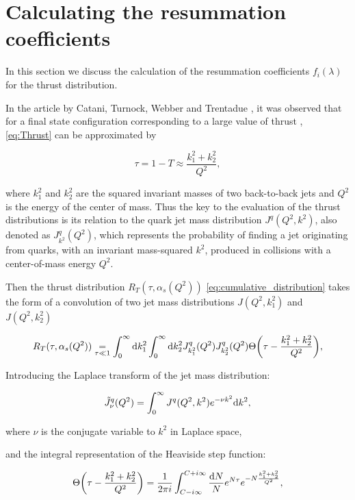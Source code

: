 \documentclass[../Tesi_Jiahao_Miao_986136.tex]{subfiles}
\begin{document}
\section{Calculating the resummation coefficients}\label{sec:f_coeff}

In this section we discuss the calculation of the resummation coefficients $f_i(\lambda)$ for the thrust distribution.

In the article by Catani, Turnock, Webber and Trentadue \cite{CATANI1991491}, it was observed that 
for a final state configuration corresponding to a large value of thrust , \cref{eq:Thrust} can be approximated by

\begin{equation} \label{eq:Thrust_approx}
    \tau = 1-T \approx \frac{k_1^2+k_2^2}{Q^2},
\end{equation}

where $k_1^2$ and $k_2^2$ are the squared invariant masses of two back-to-back jets and $Q^2$ is the energy of the center of mass.
Thus the key to the evaluation of the thrust distributions is its relation to the quark jet mass distribution $J^q(Q^2,k^2)$, also denoted as $J^q_{k^2}(Q^2)$, which represents
the probability of finding a jet originating from quarks, with an invariant mass-squared $k^2$, produced in collisions with a center-of-mass energy $Q^2$.

Then the thrust distribution $R_T(\tau,\alpha_s(Q^2))$ \cref{eq:cumulative_distribution}
takes the form of a convolution of two jet mass distributions $J(Q^2,k_1^2)$ and $J(Q^2,k_2^2)$

\begin{equation}\label{eq:Thrust fraction convolution}
    R_T(\tau,\alpha_s(Q^2)) \underset{\tau \ll 1}{=} \int_0^\infty \dd k_1^2 \int_0^\infty  \dd k_2^2 J^q_{k_1^2}(Q^2) J^q_{k_2^2}(Q^2) \Theta\qty(\tau - \frac{k_1^2+k_2^2}{Q^2}),
\end{equation}

Introducing the Laplace transform of the jet mass distribution:

\begin{equation}\label{eq:laplace_jet_mass}
    \Tilde{J}^q_\nu(Q^2) = \int_0^\infty J^q(Q^2,k^2) e^{-\nu k^2} \dd k^2,
\end{equation}

where $\nu$ is the conjugate variable to $k^2$ in Laplace space,

and the integral representation of the Heaviside step function:

\begin{equation} \label{eq:heaviside_integral_representation}
    \Theta\qty(\tau - \frac{k_1^2+k_2^2}{Q^2}) = \frac{1}{2\pi i} \int_{C-i\infty}^{C+i\infty} \frac{\dd N}{N} e^{N \tau} e^{- N \frac{k_1^2+k_2^2}{Q^2}},
\end{equation}
\end{document}

